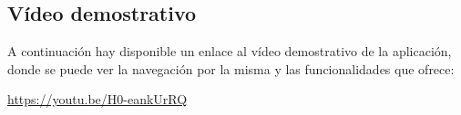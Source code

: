 \subsection{Vídeo demostrativo}

A continuación hay disponible un enlace al vídeo demostrativo de la aplicación, donde se puede ver la navegación por la misma y las funcionalidades que ofrece:\newline

\url{https://youtu.be/H0-eankUrRQ}






